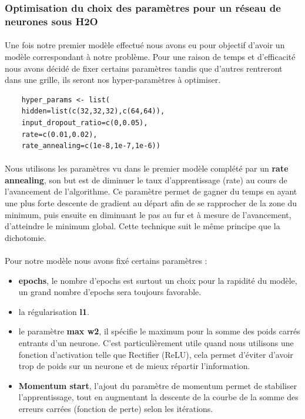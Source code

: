 \documentclass[14pt, openany]{article}
\begin{document}
\subsubsection{Optimisation du choix des paramètres pour un réseau de neurones sous H2O}

\paragraph{}
Une fois notre premier modèle effectué nous avons eu pour objectif d'avoir un modèle correspondant à notre problème. Pour une raison de temps et d'efficacité nous avons décidé de fixer certains paramètres tandis que d'autres rentreront dans une grille, ils seront nos hyper-paramètres à optimiser.

\begin{verbatim}
    hyper_params <- list(
    hidden=list(c(32,32,32),c(64,64)),
    input_dropout_ratio=c(0,0.05),
    rate=c(0.01,0.02),
    rate_annealing=c(1e-8,1e-7,1e-6))
\end{verbatim}

\paragraph{}
Nous utilisons les paramètres vu dans le premier modèle complété par un \textbf{rate annealing}, son but est de diminuer le taux d'apprentissage (rate) au cours de l'avancement de l'algorithme. Ce paramètre permet de gagner du temps en ayant une plus forte descente de gradient au départ afin de se rapprocher de la zone du minimum, puis ensuite en diminuant le pas au fur et à mesure de l'avancement, d'atteindre le minimum global. Cette technique suit le même principe que la dichotomie.

\paragraph{}
Pour notre modèle nous avons fixé certains paramètres :
\begin{itemize}
    \item \textbf{epochs}, le nombre d'epochs est surtout un choix pour la rapidité du modèle, un grand nombre d'epochs sera toujours favorable.
    \item la régularisation \textbf{l1}.
    \item le paramètre \textbf{max w2}, il spécifie le maximum pour la somme des poids carrés entrants d'un neurone. C'est particulièrement utile quand nous utilisons une fonction d'activation telle que Rectifier (ReLU), cela permet d'éviter d'avoir trop de poids sur un neurone et de mieux répartir l'information.
    \item \textbf{Momentum start}, l'ajout du paramètre de momentum permet de stabiliser l'apprentissage, tout en augmentant la descente de la courbe de la somme des erreurs carrées (fonction de perte) selon les itérations.
\end{itemize}
\end{document}
